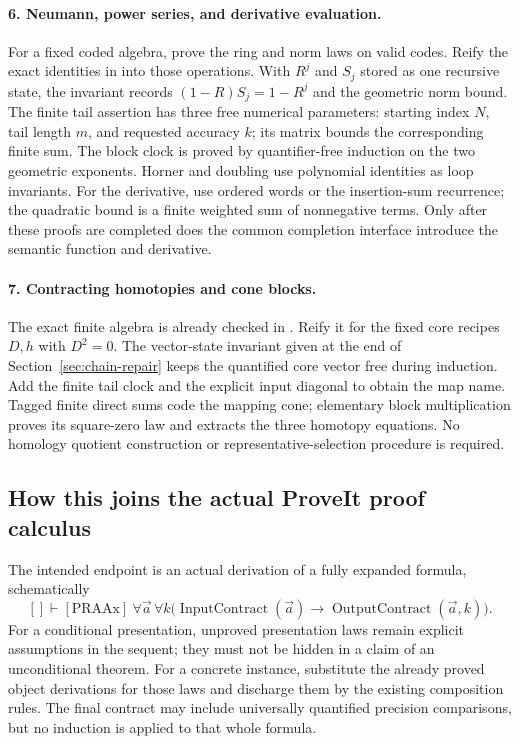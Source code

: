 \paragraph{6. Neumann, power series, and derivative evaluation.}
For a fixed coded algebra, prove the ring and norm laws on valid codes. Reify the exact identities in  into those operations. With $R^j$ and $S_j$ stored as one recursive state, the invariant records
$(1-R)S_j=1-R^j$ and the geometric norm bound. The finite tail assertion has three free numerical parameters: starting index $N$, tail length $m$, and requested accuracy $k$; its matrix bounds the corresponding finite sum. The block clock is proved by quantifier-free induction on the two geometric exponents. Horner and doubling use polynomial identities as loop invariants. For the derivative, use ordered words or the insertion-sum recurrence; the quadratic bound is a finite weighted sum of nonnegative terms. Only after these proofs are completed does the common completion interface introduce the semantic function and derivative.

\paragraph{7. Contracting homotopies and cone blocks.}
The exact finite algebra is already checked in . Reify it for the fixed core recipes $D,h$ with $D^2=0$. The vector-state invariant given at the end of Section~\ref{sec:chain-repair} keeps the quantified core vector free during induction. Add the finite tail clock and the explicit input diagonal to obtain the map name. Tagged finite direct sums code the mapping cone; elementary block multiplication proves its square-zero law and extracts the three homotopy equations. No homology quotient construction or representative-selection procedure is required.

\subsection{How this joins the actual ProveIt proof calculus}

The intended endpoint is an actual derivation of a fully expanded formula, schematically
\[
 []\vdash[\mathrm{PRAAx}]\ 
 \forall\vec a\,\forall k\bigl(
   \operatorname{InputContract}(\vec a)\to
   \operatorname{OutputContract}(\vec a,k)\bigr).
\]
For a conditional presentation, unproved presentation laws remain explicit assumptions in the sequent; they must not be hidden in a claim of an unconditional theorem. For a concrete instance, substitute the already proved object derivations for those laws and discharge them by the existing composition rules. The final contract may include universally quantified precision comparisons, but no induction is applied to that whole formula.


